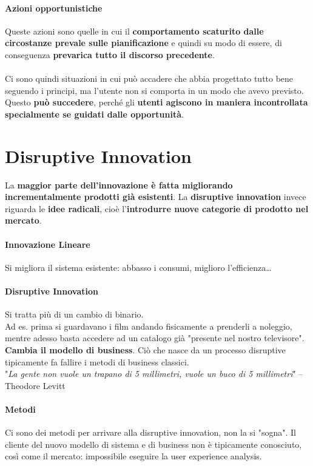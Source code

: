 \documentclass[10pt]{article}
\begin{document}
\paragraph{Azioni opportunistiche} Queste azioni sono quelle in cui il \textbf{comportamento scaturito dalle circostanze prevale sulle pianificazione} e quindi su modo di essere, di conseguenza \textbf{prevarica tutto il discorso precedente}.\\\\Ci sono quindi situazioni in cui può accadere che abbia progettato tutto bene seguendo i principi, ma l'utente non si comporta in un modo che avevo previsto. Questo \textbf{può succedere}, perché gli \textbf{utenti agiscono in maniera incontrollata specialmente se guidati dalle opportunità}.
\section{Disruptive Innovation}
La \textbf{maggior parte dell'innovazione è fatta migliorando incrementalmente prodotti già esistenti}. La \textbf{disruptive innovation} invece riguarda le \textbf{idee radicali}, cioè l'\textbf{introdurre nuove categorie di prodotto nel mercato}.
\paragraph{Innovazione Lineare} Si migliora il sistema esistente: abbasso i consumi, miglioro l'efficienza\ldots
\paragraph{Disruptive Innovation} Si tratta più di un cambio di binario.\\Ad es. prima si guardavano i film andando fisicamente a prenderli a noleggio, mentre adesso basta accedere ad un catalogo già "presente nel nostro televisore". \textbf{Cambia il modello di business}. Ciò che nasce da un processo disruptive tipicamente fa fallire i metodi di business classici.\\
"\textit{La gente non vuole un trapano di 5 millimetri, vuole un buco di 5 millimetri}" -- Theodore Levitt
\paragraph{Metodi} Ci sono dei metodi per arrivare alla disruptive innovation, non la si "sogna". Il cliente del nuovo modello di sistema e di business non è tipicamente conosciuto, così come il mercato: impossibile eseguire la user experience analysis.
\end{document}
